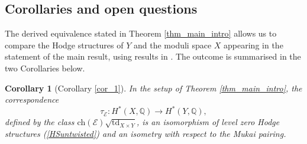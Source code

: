 \documentclass[12pt,a4paper]{amsart}
\theoremstyle{plain}
\newtheorem{maincor}[mainthm]{Corollary}
\theoremstyle{definition}
\theoremstyle{remark}
\def\td{\operatorname{td}}
\def\ch{\mathrm{ch}}
\def\H{H}
\def\QQ{\mathbb{Q}}
\newcommand{\kE}{\mathcal{E}}
\begin{document}
\subsection*{Corollaries and open questions}
The derived equivalence stated in Theorem \ref{thm_main_intro}
allows us to compare the Hodge structures of $Y$ and the moduli space $X$ appearing in the statement of the main result, using results in \cite{paolo_huy,markman}. The outcome is summarised in the two Corollaries below.

\begin{maincor}[Corollary \ref{cor_1}] In the setup of Theorem \ref{thm_main_intro}, 
the correspondence 
\begin{equation*}
		\tau_{\kE}\colon \H^{\ast}(X,\QQ)\to \H^{\ast}(Y,\QQ),
	\end{equation*} defined by the class  $\ch(\kE)\sqrt{\td_{X\times Y}}$, is an isomorphism of level zero Hodge structures (\ref{HSuntwisted}) and an isometry with respect to the Mukai pairing.
\end{maincor}
\end{document}
